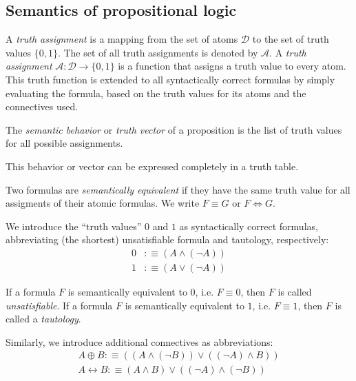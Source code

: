 \subsection{Semantics of propositional logic}
\begin{definition}[Assignment]\label{def:assignment}
  A \emph{truth assignment} is a mapping from the set of atoms \(\mathcal{D}\) to the set of truth values \(\{0,1\}\).
  The set of all truth assignments is denoted by \(\mathcal{A}\).
 A \emph{truth assignment} \(\mathcal{A} \colon \mathcal{D} \to \{0,1\}\) is a function that assigns a truth value to every atom.
 This truth function is extended to all syntactically correct formulas by simply evaluating the formula, based on the truth values for its atoms and the connectives used.
\end{definition}
\begin{definition}\label{def:truthvector}
  The \emph{semantic behavior} or \emph{truth vector} of a proposition is the list of truth values for all possible assignments.
\end{definition}
This behavior or vector can be expressed completely in a truth table.
\begin{definition}\label{def:semanticequivalence}
  Two formulas are \emph{semantically equivalent} if they have the same truth value for all assigments of their atomic formulas.
  We write \(F \equiv G\) or \(F \Leftrightarrow G\).
\end{definition}
We introduce the ``truth values'' \(0\) and \(1\) as syntactically correct formulas, abbreviating (the shortest) unsatisfiable formula and tautology, respectively:
\[
  \begin{aligned}
    0 & :\equiv (A \land (\neg A)) \\
    1 & :\equiv (A \lor (\neg A))
  \end{aligned}
\]
\begin{definition}\label{def:tautology_unsatisfiable}
If a formula \(F\) is semantically equivalent to \(0\), i.e. \(F \equiv 0\), then \(F\) is called \emph{unsatisfiable}.
If a formula \(F\) is semantically equivalent to \(1\), i.e. \(F \equiv 1\), then \(F\) is called a \emph{tautology}.
\end{definition}

Similarly, we introduce additional connectives as abbreviations:
\[
\begin{aligned}
  A \oplus B: \equiv((A \wedge(\neg B)) \vee((\neg A) \wedge B)) \\
  A \leftrightarrow B: \equiv(A \wedge B) \vee((\neg A) \wedge(\neg B))
\end{aligned}
\]


